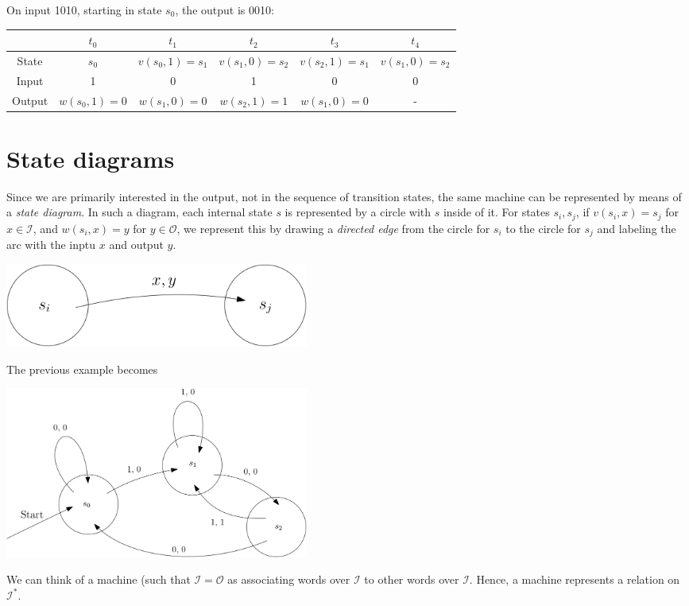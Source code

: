 \documentclass[11pt]{article}
\begin{document}
    On input 1010, starting in state \(s_0\), the output is 0010:
    \begin{center}
        \begin{tabular}{| c | c | c | c | c | c |} \hline
                   & $t_0$              & $t_1$            & $t_2$            & $t_3$            & $t_4$ \\ \hline
            State  & $s_0$              & $v(s_0,1) = s_1$ & $v(s_1,0) = s_2$ & $v(s_2,1) = s_1$ & $v(s_1,0) = s_2$ \\
            Input  & 1                  &   0              &   1              &   0              &   0  \\
            Output & $w(s_0,1) = 0$     & $w(s_1,0) = 0$   & $w(s_2,1) = 1$   & $w(s_1,0) = 0$   &   -   \\ \hline
        \end{tabular}
    \end{center}

    \pagebreak

    \section{State diagrams}

    Since we are primarily interested in the output, not in the sequence of transition states, the same machine can be represented by means of a \emph{state diagram}. In such a diagram, each internal state $s$ is represented by a circle with $s$ inside of it. For states \(s_i,s_j\), if \(v(s_i,x) = s_j\) for \(x \in \mathcal{I}\), and \(w(s_i,x) = y\) for \(y \in \mathcal{O}\), we represent this by drawing a \emph{directed edge} from the circle for \(s_i\) to the circle for \(s_j\) and labeling the arc with the inptu $x$ and output $y$.

    \begin{center}
        \includegraphics[width=10cm]{figure.png}  
    \end{center}

    The previous example becomes

    \begin{center}
        \includegraphics[width=10cm]{figure2.png}
    \end{center}

    We can think of a machine (such that \(\mathcal{I} = \mathcal{O}\) as associating words over \(\mathcal{I}\) to other words over \(\mathcal{I}\). Hence, a machine represents a relation on \(\mathcal{I}^*\).
   
\end{document}
